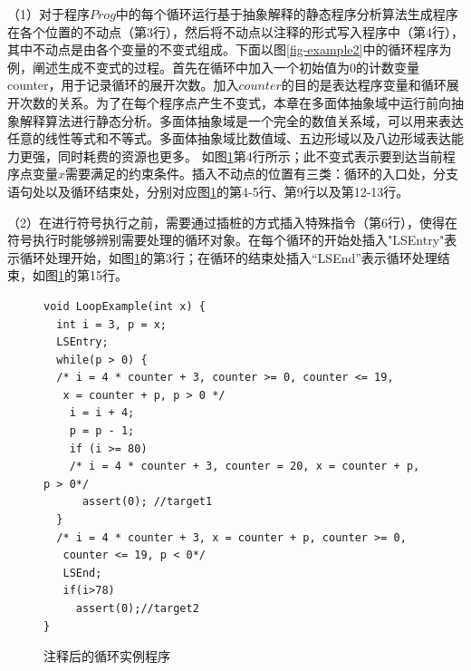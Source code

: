 
（1）对于程序$Prog$中的每个循环运行基于抽象解释的静态程序分析算法生成程序在各个位置的不动点（第3行），然后将不动点以注释的形式写入程序中（第4行），其中不动点是由各个变量的不变式组成。下面以图\ref{fig-example2}中的循环程序为例，阐述生成不变式的过程。首先在循环中加入一个初始值为0的计数变量counter，用于记录循环的展开次数。加入$counter$的目的是表达程序变量和循环展开次数的关系。为了在每个程序点产生不变式，本章在多面体抽象域中运行前向抽象解释算法进行静态分析。多面体抽象域是一个完全的数值关系域，可以用来表达任意的线性等式和不等式。多面体抽象域比数值域、五边形域以及八边形域表达能力更强，同时耗费的资源也更多。
如图\ref{fig-example3}第4行所示；此不变式表示要到达当前程序点变量$x$需要满足的约束条件。插入不动点的位置有三类：循环的入口处，分支语句处以及循环结束处，分别对应图\ref{fig-example3}的第4-5行、第9行以及第12-13行。

（2）在进行符号执行之前，需要通过插桩的方式插入特殊指令（第6行），使得在符号执行时能够辨别需要处理的循环对象。在每个循环的开始处插入"LSEntry"表示循环处理开始，如图\ref{fig-example3}的第3行；在循环的结束处插入“LSEnd”表示循环处理结束，如图\ref{fig-example3}的第15行。

\begin{figure}[h]
\begin{lstlisting}
void LoopExample(int x) {
  int i = 3, p = x;
  LSEntry;
  while(p > 0) {
  /* i = 4 * counter + 3, counter >= 0, counter <= 19,
   x = counter + p, p > 0 */
    i = i + 4;
    p = p - 1;
	if (i >= 80)
	/* i = 4 * counter + 3, counter = 20, x = counter + p, p > 0*/
	  assert(0); //target1
  }
  /* i = 4 * counter + 3, x = counter + p, counter >= 0, 
   counter <= 19, p < 0*/
   LSEnd;
   if(i>78)
     assert(0);//target2
}
\end{lstlisting}
\caption{注释后的循环实例程序}
\label{fig-example3}
\end{figure}

